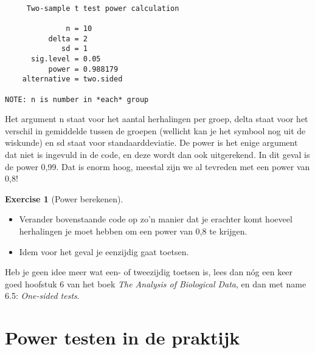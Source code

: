\documentclass[
  letterpaper,
  DIV=11,
  numbers=noendperiod]{scrreprt}
\providecommand{\tightlist}{%
  \setlength{\itemsep}{0pt}\setlength{\parskip}{0pt}}\usepackage{longtable,booktabs,array}
\theoremstyle{definition}
\newtheorem{exercise}{Exercise}[chapter]
\theoremstyle{remark}
\begin{document}
\begin{verbatim}

     Two-sample t test power calculation 

              n = 10
          delta = 2
             sd = 1
      sig.level = 0.05
          power = 0.988179
    alternative = two.sided

NOTE: n is number in *each* group
\end{verbatim}

Het argument n staat voor het aantal herhalingen per groep, delta staat
voor het verschil in gemiddelde tussen de groepen (wellicht kan je het
symbool \delta nog uit de wiskunde) en sd staat voor standaarddeviatie.
De power is het enige argument dat niet is ingevuld in de code, en deze
wordt dan ook uitgerekend. In dit geval is de power 0,99. Dat is enorm
hoog, meestal zijn we al tevreden met een power van 0,8!

\leavevmode{}%
\begin{exercise}[Power berekenen]\label{exr-powerberekenen}

\begin{itemize}
\tightlist
\item
  Verander bovenstaande code op zo'n manier dat je erachter komt hoeveel
  herhalingen je moet hebben om een power van 0,8 te krijgen.
\item
  Idem voor het geval je eenzijdig gaat toetsen.
\end{itemize}

\end{exercise}

\begin{tcolorbox}[enhanced jigsaw, colbacktitle=quarto-callout-color!10!white, colframe=quarto-callout-color-frame, leftrule=.75mm, title={Warning}, coltitle=black, toprule=.15mm, colback=white, breakable, opacityback=0, bottomrule=.15mm, arc=.35mm, opacitybacktitle=0.6, bottomtitle=1mm, toptitle=1mm, rightrule=.15mm, titlerule=0mm, left=2mm]
Heb je geen idee meer wat een- of tweezijdig toetsen is, lees dan nóg
een keer goed hoofstuk 6 van het boek \emph{The Analysis of Biological
Data}, en dan met name 6.5: \emph{One-sided tests}.
\end{tcolorbox}

\hypertarget{power-testen-in-de-praktijk}{%
\section{Power testen in de
praktijk}\label{power-testen-in-de-praktijk}}
\end{document}
